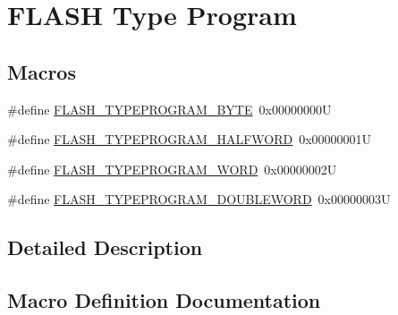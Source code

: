 \hypertarget{group___f_l_a_s_h___type___program}{}\section{F\+L\+A\+SH Type Program}
\label{group___f_l_a_s_h___type___program}
\subsection*{Macros}
\begin{DoxyCompactItemize}
\item 
\#define \hyperlink{group___f_l_a_s_h___type___program_gac975d7139325057ed0069c6b55e4faed}{F\+L\+A\+S\+H\+\_\+\+T\+Y\+P\+E\+P\+R\+O\+G\+R\+A\+M\+\_\+\+B\+Y\+TE}~0x00000000U
\item 
\#define \hyperlink{group___f_l_a_s_h___type___program_ga2b607dfc2efd463a8530e327bc755582}{F\+L\+A\+S\+H\+\_\+\+T\+Y\+P\+E\+P\+R\+O\+G\+R\+A\+M\+\_\+\+H\+A\+L\+F\+W\+O\+RD}~0x00000001U
\item 
\#define \hyperlink{group___f_l_a_s_h___type___program_gadd25c6821539030ba6711e7c0d586c3e}{F\+L\+A\+S\+H\+\_\+\+T\+Y\+P\+E\+P\+R\+O\+G\+R\+A\+M\+\_\+\+W\+O\+RD}~0x00000002U
\item 
\#define \hyperlink{group___f_l_a_s_h___type___program_gabdc2b0b4d2e66c2be90fafbfbf1e225f}{F\+L\+A\+S\+H\+\_\+\+T\+Y\+P\+E\+P\+R\+O\+G\+R\+A\+M\+\_\+\+D\+O\+U\+B\+L\+E\+W\+O\+RD}~0x00000003U
\end{DoxyCompactItemize}


\subsection{Detailed Description}


\subsection{Macro Definition Documentation}
\mbox{\label{group___f_l_a_s_h___type___program_gac975d7139325057ed0069c6b55e4faed}} 
